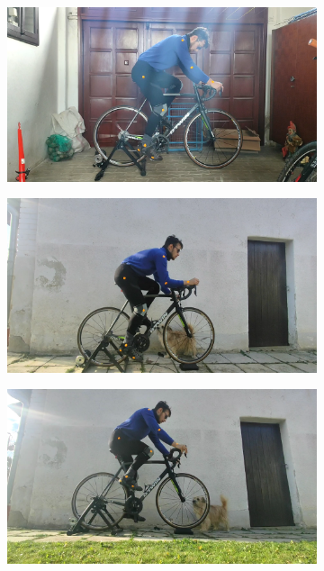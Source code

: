 \begin{figure}[htbp]
    \centering
    \begin{subfigure}[b]{\imgwidth}
        \centering

        \includegraphics[width=1\linewidth]{obrazky-figures/1.png}

    \end{subfigure}
    \hfill
    \begin{subfigure}[b]{\imgwidth}
        \centering

        \includegraphics[width=1\linewidth]{obrazky-figures/2.png}

    \end{subfigure}
    \hfill
    \begin{subfigure}[b]{\imgwidth}
        \centering

        \includegraphics[width=1\linewidth]{obrazky-figures/3.png}
    \end{subfigure}


\end{figure}
